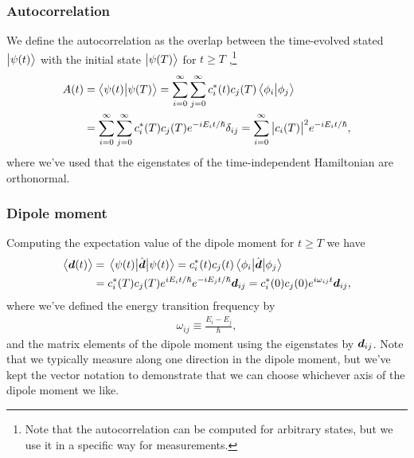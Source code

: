             \subsubsection{Autocorrelation}
                We define the autocorrelation as the overlap between the
                time-evolved stated $\ket{\psi(t)}$ with the initial state
                $\ket{\psi(T)}$ for $t \geq T$ \cite{robinett20041,
                pedersen2018symplectic},\footnote{%
                    Note that the autocorrelation can be computed for arbitrary
                    states, but we use it in a specific way for measurements.
                }
                \begin{align}
                    A(t)
                    &= \braket{\psi(t)}{\psi(T)}
                    =
                    \sum_{i = 0}^{\infty}
                    \sum_{j = 0}^{\infty}
                    c^{*}_i(t) c_j(T)
                    \braket{\phi_i}{\phi_j}
                    \\
                    &=
                    \sum_{i = 0}^{\infty}
                    \sum_{j = 0}^{\infty}
                    c^{*}_i(T) c_j(T) e^{-i E_i t/\hslash}
                    \delta_{ij}
                    =
                    \sum_{i = 0}^{\infty}
                    \abs{c_i(T)}^2 e^{-i E_i t/\hslash},
                \end{align}
                where we've used that the eigenstates of the time-independent
                Hamiltonian are orthonormal.

            \subsubsection{Dipole moment}
                Computing the expectation value of the dipole moment for $t \geq
                T$ we have
                \begin{align}
                    \expval{\boldsymbol{d}(t)}
                    &= \mel{\psi(t)}{\hat{\boldsymbol{d}}}{\psi(t)}
                    =
                    c^{*}_i(t)c_j(t)\mel{\phi_i}{\hat{\boldsymbol{d}}}{\phi_j}
                    \\
                    &=
                    c^{*}_i(T)c_j(T) e^{i E_i t/\hslash}
                    e^{-i E_j t / \hslash}
                    \boldsymbol{d}_{ij}
                    =
                    c^{*}_i(0)c_j(0) e^{i \omega_{ij} t}
                    \boldsymbol{d}_{ij},
                \end{align}
                where we've defined the energy transition frequency by
                \begin{align}
                    \omega_{ij} \equiv \frac{E_i - E_j}{\hslash},
                \end{align}
                and the matrix elements of the dipole moment using the
                eigenstates by $\boldsymbol{d}_{ij}$.
                Note that we typically measure along one direction in the dipole
                moment, but we've kept the vector notation to demonstrate that
                we can choose whichever axis of the dipole moment we like.

